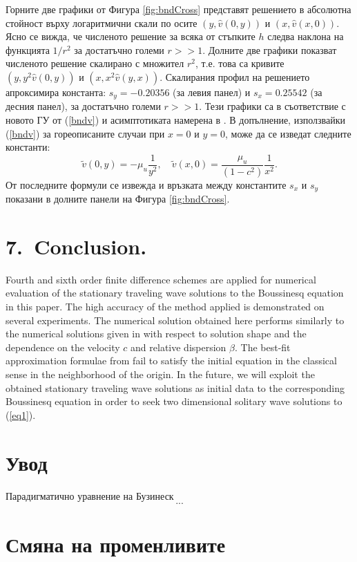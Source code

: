 \documentclass{article}
\newcommand{\be}{\begin{equation}}
\newcommand{\ee}{\end{equation}}
\newcommand{\rf}[1]{(\ref{#1})}
\begin{document}
\FloatBarrier
Горните две графики от Фигура \ref{fig:bndCross} представят решението в абсолютна стойност върху логаритмични скали по осите $(y,\widehat v(0,y) )$ и $(x,\widehat v(x,0))$. Ясно се вижда, че численото решение за всяка от стъпките $h$ следва наклона на функцията $1/r^2$ за достатъчно големи $r >> 1$. Долните две графики показват численото решение скалирано с множител $r^2$, т.е. това са кривите $(y, y^2 \widehat v(0, y) )$ и $(x, x^2 \widehat v(y, x) )$. Скалирания профил на решението апроксимира константа: $s_y=-0.20356$ (за левия панел) и $s_x=0.25542$ (за десния панел), за достатъчно големи $r >> 1$. Тези графики са в съответствие с новото ГУ от \rf{bndv} и асимптотиката намерена в \cite{ref116}. В допълнение, използвайки \rf{bndv} за гореописаните случаи при $x=0$ и $y=0$, може да се изведат следните константи:
\be
\tilde v(0, y) = -\mu_u \frac{1}{y^2}, \quad \tilde v(x, 0) = \frac{\mu_u}{(1-c^2)} \frac{1}{x^2}.
\ee
От последните формули се извежда и връзката между константите $s_x$ и $s_y$ показани в долните панели на Фигура \ref{fig:bndCross}.
\section{7.~Conclusion.}
Fourth and sixth order finite difference schemes are applied for numerical evaluation of the stationary traveling wave solutions to the Boussinesq equation in this paper. The high accuracy of the method applied is demonstrated on several experiments. The numerical solution obtained here performs similarly to the numerical solutions given in \cite{Ch2012,Ch2011} with respect to solution shape and the dependence on the velocity $c$ and relative dispersion $\beta$. 
The best-fit approximation formulae from \cite{Ch2011} fail to satisfy the initial equation in the classical sense in the neighborhood of the origin. 
In the future, we will exploit the obtained stationary traveling wave solutions as initial data to the corresponding Boussinesq equation in order to seek two dimensional solitary wave solutions to \rf{eq1}.

\bigskip



\section{Увод}
Парадигматично уравнение на Бузинеск
\be\label{problemCh}
...
\ee


\section{Смяна на променливите}
\end{document}
